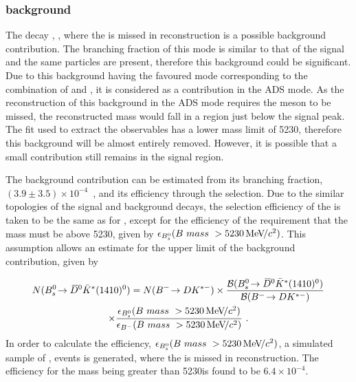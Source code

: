 \subsubsection{\boldmath {} background}
\label{sec:backgrounds:bs}

The decay , , where the \pip is missed in reconstruction is a possible background contribution. The branching fraction of this mode is similar to that of the signal and the same particles are present, therefore this background could be significant. Due to this background having the favoured mode corresponding to the combination of \Dzb and \Kstarm, it is considered as a contribution in the ADS mode. As the reconstruction of this background in the ADS mode requires the \pip meson to be missed, the reconstructed \Bm mass would fall in a region just below the signal peak. The fit used to extract the \CP observables has a lower mass limit of 5230\mevcc, therefore this background will be almost entirely removed. However, it is possible that a small contribution still remains in the signal region. 

The  background contribution can be estimated from its branching fraction, $\left(3.9 \pm 3.5\right) \times 10^{-4}$~\cite{PDG2016}, and its efficiency through the \btodkst selection. Due to the similar topologies of the signal and background decays, the selection efficiency of the  is taken to be the same as for \btodkst, except for the efficiency of the requirement that the \Bm mass must be above 5230\mevcc, given by $\epsilon_{{{B}^0_{s}}}(B\ mass\ > 5230{\mathrm{\,Me\kern -0.1em V\!/}c^2})$. This assumption allows an estimate for the upper limit of the background contribution, given by 

\begin{multline}
N(\decay{\Bs}{\Dzb\bar{K}^{*}(1410)^0}) = N(\btodkst) \times \frac{\BF(\decay{\Bs}{\Dzb\bar{K}^{*}(1410)^0})}{\BF(\btodkst)} \\ \times \frac{\epsilon_{\Bs}(B\ mass\ > 5230\mevcc)}{\epsilon_{\Bm}(B\ mass\ > 5230\mevcc)} \text { .}
\label{Bscalc}
\end{multline}
In order to calculate the efficiency, $\epsilon_{{{B}^0_{s}}}(B\ mass\ > 5230{\mathrm{\,Me\kern -0.1em V\!/}c^2})$, a simulated sample of ,  events is generated, where the \pip is missed in reconstruction. The efficiency for the \Bm mass being greater than 5230\mevcc is found to be $6.4 \times 10^{-4}$. 

